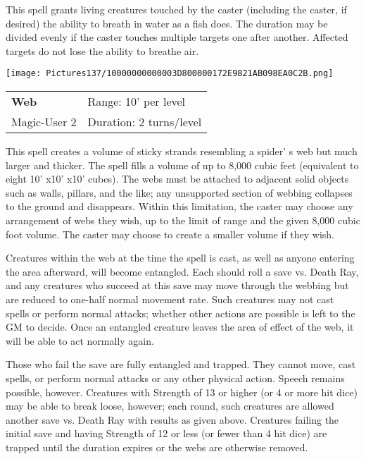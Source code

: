 \documentclass[a4paper,twoside,openany,10pt]{book}
\begin{document}
\begin{multicols}{2}
This spell grants living creatures touched by the caster (including the caster, if desired) the ability to breath in water as a fish does. The duration may be divided evenly if the caster touches multiple targets one after another. Affected targets do not lose the ability to breathe air.

\medskip

\begin{flushleft}
\texttt{[image: Pictures137/10000000000003D800000172E9821AB098EA0C2B.png]}
\end{flushleft}

\smallskip\begin{flushleft} 
	\begin{tabularx}{0.45\textwidth}{@{}m{3.5cm}m{5.5cm}@{}} 
		\textbf{Web} & Range: 10' per level\\
		Magic-User 2 &Duration: 2 turns/level\\
	\end{tabularx}\end{flushleft}

This spell creates a volume of sticky strands resembling a spider' s web but much larger and thicker. The spell fills a volume of up to 8,000 cubic feet (equivalent to eight 10' x10' x10' cubes). The webs must be attached to adjacent solid objects such as walls, pillars, and the like; any unsupported section of webbing collapses to the ground and disappears. Within this limitation, the caster may choose any arrangement of webs they wish, up to the limit of range and the given 8,000 cubic foot volume. The caster may choose to create a smaller volume if they wish.

Creatures within the web at the time the spell is cast, as well as anyone entering the area afterward, will become entangled. Each should roll a save vs. Death Ray, and any creatures who succeed at this save may move through the webbing but are reduced to one-half normal movement rate. Such creatures may not cast spells or perform normal attacks; whether other actions are possible is left to the GM to decide. Once an entangled creature leaves the area of effect of the web, it will be able to act normally again.

Those who fail the save are fully entangled and trapped. They cannot move, cast spells, or perform normal attacks or any other physical action. Speech remains possible, however. Creatures with Strength of 13 or higher (or 4 or more hit dice) may be able to break loose, however; each round, such creatures are allowed another save vs. Death Ray with results as given above. Creatures failing the initial save and having Strength of 12 or less (or fewer than 4 hit dice) are trapped until the duration expires or the webs are otherwise removed.


\end{multicols}
\end{document}
